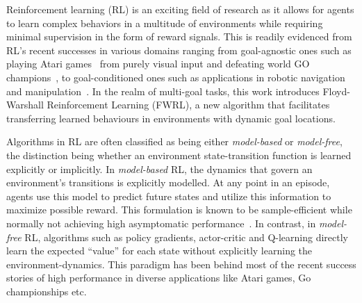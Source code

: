 Reinforcement learning (RL) is an exciting field of research as it
allows for agents to learn complex behaviors in a multitude of
environments while requiring minimal supervision in the form of reward
signals. This is readily evidenced from RL's recent successes in various
domains ranging from goal-agnostic ones such as  playing Atari
games~\citep{MnKaSiNATURE2015} from purely visual input and defeating
world GO champions~\citep{gibney2016google}, to goal-conditioned ones
such as applications in robotic
navigation~\citep{mirowski2018learning} and
manipulation~\citep{pong2018temporal}. In the realm of multi-goal tasks,
this work introduces Floyd-Warshall Reinforcement Learning (FWRL), a new
algorithm that facilitates transferring learned behaviours in
environments with dynamic goal locations.


Algorithms in RL are often classified as being either \emph{model-based}
or \emph{model-free}, the distinction being whether an environment
state-transition function is learned explicitly or implicitly.  In
\emph{model-based} RL, the dynamics that govern an environment's
transitions is explicitly modelled.  At any point in an episode, agents
use this model to predict future states and utilize this information to
maximize possible reward. This formulation is known to be
sample-efficient while normally not achieving high asymptomatic
performance~\citep{pong2018temporal}.  In contrast, in \emph{model-free}
RL, algorithms such as policy gradients, actor-critic and Q-learning
directly learn the expected ``value'' for each state without explicitly
learning the environment-dynamics. This paradigm has been behind most of
the recent success stories of high performance in diverse applications
like Atari games, Go championships etc.

